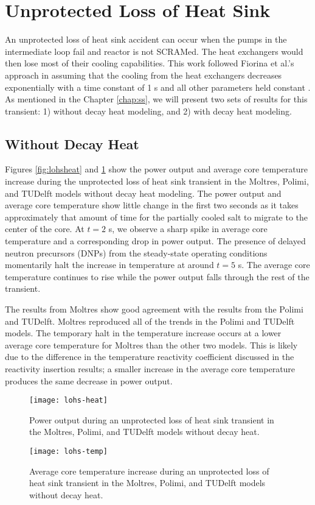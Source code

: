 \clearpage

\section{Unprotected Loss of Heat Sink}

An unprotected loss of heat sink accident can occur when the pumps in the
intermediate loop fail and reactor is not SCRAMed. The heat exchangers would
then lose most of their
cooling capabilities. This work followed Fiorina et al.'s approach in assuming
that the cooling from the heat exchangers decreases exponentially with a time
constant of 1 s and all other parameters held constant
\cite{fiorina_modelling_2014}. As mentioned in the Chapter \ref{chap:ss}, we
will present two sets of results for this transient: 1) without decay heat
modeling, and 2) with decay heat modeling.

\subsection{Without Decay Heat} \label{sec:wodecayheat}

Figures \ref{fig:lohsheat} and \ref{fig:lohstemp} show the power output and
average core temperature increase during the unprotected loss of heat sink
transient in the Moltres, Polimi, and TUDelft models without decay heat
modeling. The power output and average core temperature show little change in
the first two seconds as it takes approximately that amount of time for the
partially cooled salt to migrate to the center of the core. At $t=2$ s, we
observe a sharp spike in average core temperature and a corresponding drop
in power output. The presence of delayed neutron precursors (DNPs) from the
steady-state operating conditions momentarily halt the increase in temperature
at around $t=5$ s. The average core temperature continues to rise while the
power output falls through the rest of the transient.

The results from Moltres show good agreement with the results from the Polimi
and TUDelft. Moltres reproduced all of the trends in the Polimi
and TUDelft models. The temporary halt in the temperature increase occurs at
a lower average core temperature for Moltres than the other two models. This
is likely due to the difference in the temperature reactivity coefficient
discussed in the reactivity insertion results; a smaller increase in
the average core temperature produces the same decrease in power output.

\begin{figure}[htbp!]
    \centering
    \texttt{[image: lohs-heat]}
    \caption{Power output during
    an unprotected loss of heat sink transient in the Moltres, Polimi, and
    TUDelft models \cite{fiorina_modelling_2014} without decay heat.}
    \label{fig:lohsheat}
    \texttt{[image: lohs-temp]}
    \caption{Average core temperature increase during
    an unprotected loss of heat sink transient in the Moltres, Polimi, and
    TUDelft models \cite{fiorina_modelling_2014} without decay heat.}
    \label{fig:lohstemp}
\end{figure}

